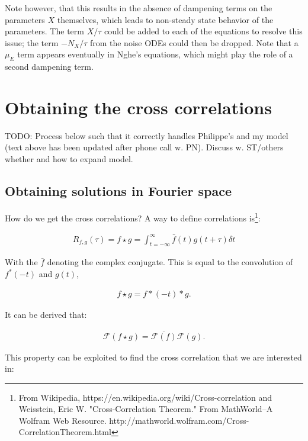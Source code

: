 Note however, that this results in the absence of dampening terms on the parameters $X$ themselves, which leads to non-steady state behavior of the parameters.
The term $X/\tau$ could be added to each of the equations to resolve this issue; the term $-N_X/\tau$ from the noise ODEs could then be dropped.
{\color{red}Note that a $\mu_E$ term appears eventually in Nghe's equations, which might play the role of a second dampening term.}




\section{Obtaining the cross correlations}

{\color{red}TODO: Process below such that it correctly handles Philippe's and my model (text above has been updated after phone call w. PN). Discuss w. ST/others whether and how to expand model.}

\subsection{Obtaining solutions in Fourier space}

How do we get the cross correlations? A way to define correlations is\footnote{From Wikipedia, https://en.wikipedia.org/wiki/Cross-correlation and Weisstein, Eric W. "Cross-Correlation Theorem." From MathWorld--A Wolfram Web Resource. http://mathworld.wolfram.com/Cross-CorrelationTheorem.html}:

\begin{align}
R_{f,g}(\tau) = f \star g = \int_{t=-\infty}^{\infty} {\bar f(t) g(t+\tau) \delta t}
\end{align}

With the $\bar{f}$ denoting the complex conjugate. This is equal to the convolution of $f^*(-t)$ and $g(t)$, 

\begin{align}
f \star g = f*(-t) * g
.
\end{align}

It can be derived that:

\begin{align}
\mathcal{F} (f \star g) = \overline{\mathcal{F} (f)} \mathcal{F}(g)
.
\end{align}

This property can be exploited to find the cross correlation that we are interested in:

